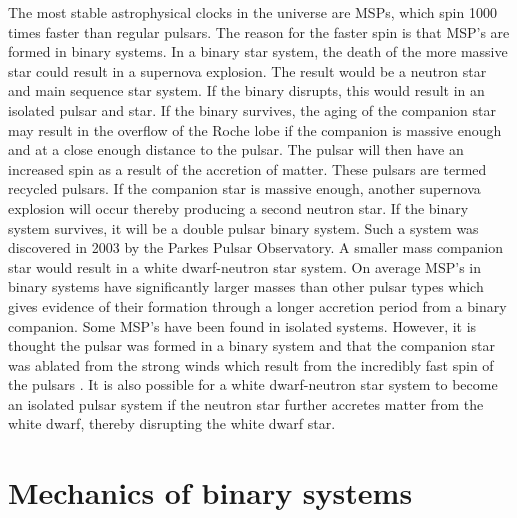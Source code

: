 \documentclass[12pt]{article}
\begin{document}
	
	
	
	
	
	The most stable astrophysical clocks in the universe are MSPs, which spin 1000 times faster than regular pulsars. The reason for the faster spin is that MSP's are formed in binary systems. In a binary star system, the death of the more massive star could result in a supernova explosion. The result would be a neutron star and main sequence star system. If the binary disrupts, this would result in an isolated pulsar and star. If the binary survives, the aging of the companion star may result in the overflow of the Roche lobe if the companion is massive enough and at a close enough distance to the pulsar. The pulsar will then have an increased spin as a result of the accretion of matter. These pulsars are termed recycled pulsars. If the companion star is massive enough, another supernova explosion will occur thereby producing a second neutron star. If the binary system survives, it will be a double pulsar binary system. Such a system was discovered in 2003 by the Parkes Pulsar Observatory. A smaller mass companion star would result in a white dwarf-neutron star system. On average MSP's in binary systems have significantly larger masses than other pulsar types which gives evidence of their formation through a longer accretion period from a binary companion. Some MSP's have been found in isolated systems. However, it is thought the pulsar was formed in a binary system and that the companion star was ablated from the strong winds which result from the incredibly fast spin of the pulsars \cite{kluzniak1988nature}. It is also possible for a white dwarf-neutron star system to become an isolated pulsar system if the neutron star further accretes matter from the white dwarf, thereby disrupting the white dwarf star. 
	
	\section{Mechanics of binary systems}
	\label{sec:Mechanics of binary systems}
	
\end{document}
